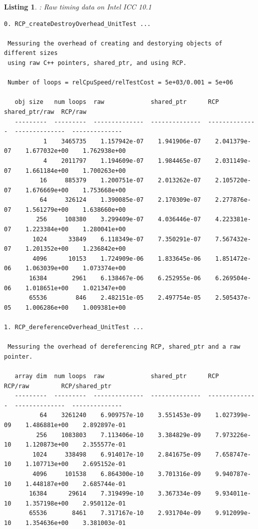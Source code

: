 \documentclass[pdf,ps2pdf,11pt]{SANDreport}
\newtheorem{listing}{Listing}
\begin{document}
\begin{listing}: Raw {} timing data on Intel ICC 10.1  \\
\label{listing:RCP-ICC-Timings}
{\scriptsize\begin{verbatim}
0. RCP_createDestroyOverhead_UnitTest ... 
 
 Messuring the overhead of creating and destorying objects of different sizes
 using raw C++ pointers, shared_ptr, and using RCP.
 
 Number of loops = relCpuSpeed/relTestCost = 5e+03/0.001 = 5e+06
 
   obj size   num loops  raw             shared_ptr      RCP             shared_ptr/raw  RCP/raw       
   ---------  ---------  --------------  --------------  --------------  --------------  --------------
           1    3465735    1.157942e-07    1.941906e-07    2.041379e-07    1.677032e+00    1.762938e+00
           4    2011797    1.194609e-07    1.984465e-07    2.031149e-07    1.661184e+00    1.700263e+00
          16     885379    1.200751e-07    2.013262e-07    2.105720e-07    1.676669e+00    1.753668e+00
          64     326124    1.390085e-07    2.170309e-07    2.277876e-07    1.561279e+00    1.638660e+00
         256     108380    3.299409e-07    4.036446e-07    4.223381e-07    1.223384e+00    1.280041e+00
        1024      33849    6.118349e-07    7.350291e-07    7.567432e-07    1.201352e+00    1.236842e+00
        4096      10153    1.724909e-06    1.833645e-06    1.851472e-06    1.063039e+00    1.073374e+00
       16384       2961    6.138467e-06    6.252955e-06    6.269504e-06    1.018651e+00    1.021347e+00
       65536        846    2.482151e-05    2.497754e-05    2.505437e-05    1.006286e+00    1.009381e+00

1. RCP_dereferenceOverhead_UnitTest ... 
 
 Messuring the overhead of dereferencing RCP, shared_ptr and a raw pointer.
 
   array dim  num loops  raw             shared_ptr      RCP             RCP/raw         RCP/shared_ptr
   ---------  ---------  --------------  --------------  --------------  --------------  --------------
          64    3261240    6.909757e-10    3.551453e-09    1.027399e-09    1.486881e+00    2.892897e-01
         256    1083803    7.113406e-10    3.384829e-09    7.973226e-10    1.120873e+00    2.355577e-01
        1024     338498    6.914017e-10    2.841675e-09    7.658747e-10    1.107713e+00    2.695152e-01
        4096     101538    6.864300e-10    3.701316e-09    9.940787e-10    1.448187e+00    2.685744e-01
       16384      29614    7.319499e-10    3.367334e-09    9.934011e-10    1.357198e+00    2.950112e-01
       65536       8461    7.317167e-10    2.931704e-09    9.912099e-10    1.354636e+00    3.381003e-01


\end{verbatim}}
\end{listing}
\end{document}
